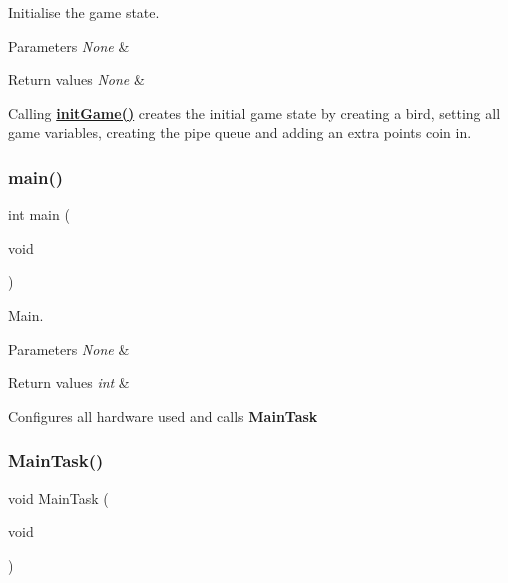 Initialise the game state. 


\begin{DoxyParams}{Parameters}
{\em None} & \\
\hline
\end{DoxyParams}

\begin{DoxyRetVals}{Return values}
{\em None} & \\
\hline
\end{DoxyRetVals}
Calling {\bfseries \hyperlink{group___game___start___functions_ga486f7b71aa892de0f05c6187647613b9}{init\+Game()}} creates the initial game state by creating a bird, setting all game variables, creating the pipe queue and adding an extra points coin in. \mbox{\label{group___game___start___functions_ga840291bc02cba5474a4cb46a9b9566fe}} 
\subsubsection{\texorpdfstring{main()}{main()}}
{\footnotesize\ttfamily int main (\begin{DoxyParamCaption}\item[{void}]{ }\end{DoxyParamCaption})}



Main. 


\begin{DoxyParams}{Parameters}
{\em None} & \\
\hline
\end{DoxyParams}

\begin{DoxyRetVals}{Return values}
{\em int} & \\
\hline
\end{DoxyRetVals}
Configures all hardware used and calls {\bfseries Main\+Task} \mbox{\label{group___game___start___functions_gaec7cf19e4225041fa5e3ea90b904b775}} 
\subsubsection{\texorpdfstring{Main\+Task()}{MainTask()}}
{\footnotesize\ttfamily void Main\+Task (\begin{DoxyParamCaption}\item[{void}]{ }\end{DoxyParamCaption})}



